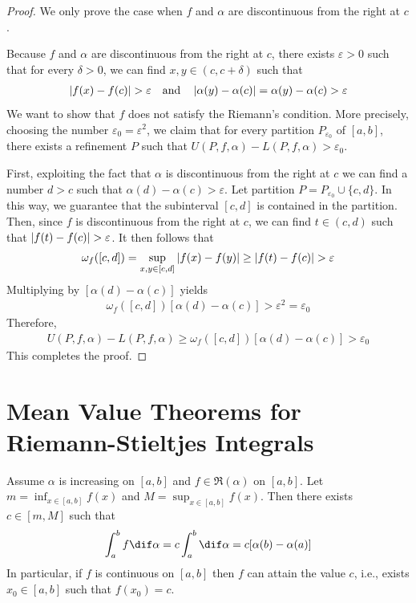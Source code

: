 \documentclass[thmcnt=section, color=blue, 12pt]{my-elegantbook}
\begin{document}
\begin{proof}
	We only prove the case
	when $f$ and $\alpha$ are discontinuous from the right at $c$.

	Because $f$ and $\alpha$ are discontinuous from the right at $c$,
	there exists $\varepsilon > 0$ such that for every $\delta > 0$,
	we can find $x, y \in (c, c+\delta)$ such that
	\begin{align*}
		\left\lvert f(x) - f(c) \right\rvert > \varepsilon
		\quad \text{and} \quad
		\left\lvert \alpha(y) - \alpha(c) \right\rvert = \alpha(y) - \alpha(c) > \varepsilon
	\end{align*}
	We want to show that $f$ does not satisfy the Riemann's condition.
	More precisely, choosing the number $\varepsilon_0 = \varepsilon^2$,
	we claim that for every partition $P_{\varepsilon_0}$ of $[a, b]$,
	there exists a refinement $P$ such
	that $U(P, f, \alpha) - L(P, f, \alpha) > \varepsilon_0$.

	First, exploiting the fact that $\alpha$ is discontinuous from the right at $c$
	we can find a number $d > c$ such
	that $\alpha(d) - \alpha(c) > \varepsilon$.
	Let partition $P = P_{\varepsilon_0} \cup \{c, d\}$.
	In this way, we guarantee that the subinterval $[c, d]$
	is contained in the partition.
	Then, since $f$ is discontinuous from the right at $c$,
	we can find $t \in (c, d)$ such that $\left\lvert f(t) - f(c) \right\rvert > \varepsilon$.
	It then follows that
	\begin{align*}
		\omega_f([c, d])
		= \sup_{x, y \in [c, d]} \left\lvert f(x) - f(y) \right\rvert
		\geq \left\lvert f(t) - f(c) \right\rvert
		> \varepsilon
	\end{align*}
	Multiplying by $ [\alpha(d) - \alpha(c)]$ yields
	\begin{align*}
		\omega_f([c, d]) [\alpha(d) - \alpha(c)] > \varepsilon^2 = \varepsilon_0
	\end{align*}
	Therefore,
	\begin{align*}
		U(P, f, \alpha) - L(P, f, \alpha)
		\geq \omega_f([c, d]) [\alpha(d) - \alpha(c)]
		> \varepsilon_0
	\end{align*}
	This completes the proof.
\end{proof}


\section{Mean Value Theorems for Riemann-Stieltjes Integrals}

\begin{theorem} \label{thm:18}
	Assume $\alpha$ is increasing on $[a, b]$ and $f \in \mathfrak{R}(\alpha)$
	on $[a, b]$.
	Let $m = \inf_{x \in [a, b]}f(x)$ and $M = \sup_{x \in [a, b]}f(x)$.
	Then there exists $c \in [m, M]$
	such that
	\begin{align*}
		\int_a^b f \dif \alpha
		= c \int_a^b \dif \alpha = c[\alpha(b) -\alpha(a)]
	\end{align*}
	In particular, if $f$ is continuous on $[a, b]$
	then $f$ can attain the value $c$, i.e.,
	exists $x_0 \in [a, b]$ such that $f(x_0) = c$.
\end{theorem}
\end{document}
